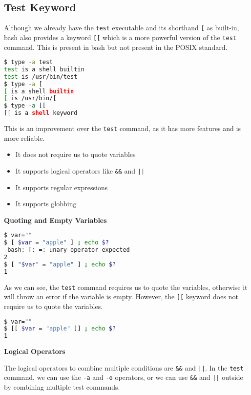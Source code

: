 \subsection{Test Keyword}

Although we already have the \lstinline|test| executable and its shorthand \lstinline|[| as built-in, bash also provides a keyword \lstinline|[[| which is a more powerful version of the \lstinline|test| command. This is present in bash
but not present in the POSIX standard.

\begin{lstlisting}[language=bash]
$ type -a test
test is a shell builtin
test is /usr/bin/test
$ type -a [
[ is a shell builtin
[ is /usr/bin/[
$ type -a [[
[[ is a shell keyword
\end{lstlisting}

This is an improvement over the \lstinline|test| command, as it has more features and is more reliable.

\begin{itemize}
    \item It does not require us to quote variables
    \item It supports logical operators like \lstinline{&&} and \lstinline{||}
    \item It supports regular expressions
    \item It supports globbing
\end{itemize}

\textbf{Quoting and Empty Variables}

\begin{lstlisting}[language=bash]
$ var=""
$ [ $var = "apple" ] ; echo $?
-bash: [: =: unary operator expected
2
$ [ "$var" = "apple" ] ; echo $?
1
\end{lstlisting}

As we can see, the \lstinline|test| command requires us to quote the variables, otherwise it will throw an error if the variable is empty. However, the \lstinline|[[| keyword does not require us to quote the variables.

\begin{lstlisting}[language=bash]
$ var=""
$ [[ $var = "apple" ]] ; echo $?
1
\end{lstlisting}

\textbf{Logical Operators}

The logical operators to combine multiple conditions are \lstinline{&&} and \lstinline{||}.
In the \lstinline{test} command, we can use the \lstinline{-a} and \lstinline{-o} operators, or we can use \lstinline|&&| and \lstinline{||} outside by combining multiple test commands.

